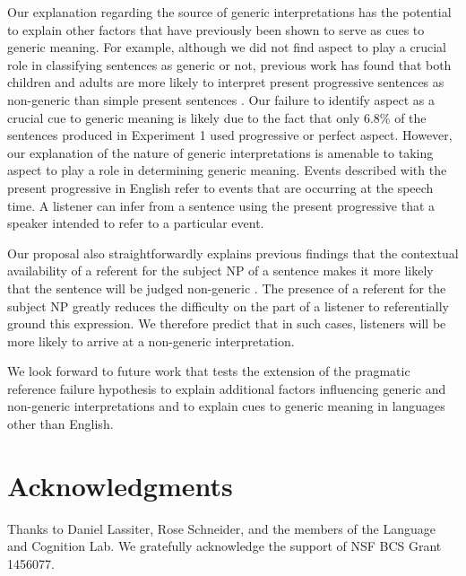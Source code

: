\documentclass[10pt,letterpaper]{article}
\begin{document}
Our explanation regarding the source of generic interpretations has the potential to explain other factors that have previously been shown to serve as cues to generic meaning. For example, although we did not find aspect to play a crucial role in classifying sentences as generic or not, previous work has found that both children and adults are more likely to interpret present progressive sentences as non-generic than simple present sentences \cite{Cimpian:2011}. Our failure to identify aspect as a crucial cue to generic meaning is likely due to the fact that only 6.8\% of the sentences produced in Experiment 1 used progressive or perfect aspect. However, our explanation of the nature of generic interpretations is amenable to taking aspect to play a role in determining generic meaning. Events described with the present progressive in English refer to events that are occurring at the speech time. A listener can infer from a sentence using the present progressive that a speaker intended to refer to a particular event.

Our proposal also straightforwardly explains previous findings that the contextual availability of a referent for the subject NP of a sentence makes it more likely that the sentence will be judged non-generic \cite{Gelman:2003}. The presence of a referent for the subject NP greatly reduces the difficulty on the part of a listener to referentially ground this expression. We therefore predict that in such cases, listeners will be more likely to arrive at a non-generic interpretation. 

We look forward to future work that tests the extension of the pragmatic reference failure hypothesis to explain additional factors influencing generic and non-generic interpretations and to explain cues to generic meaning in languages other than English.

\section{Acknowledgments}

Thanks to Daniel Lassiter, Rose Schneider, and the members of the Language and Cognition Lab. We gratefully acknowledge the support of NSF BCS Grant 1456077.



\setlength{\bibleftmargin}{.125in}
\setlength{\bibindent}{-\bibleftmargin}


\end{document}
